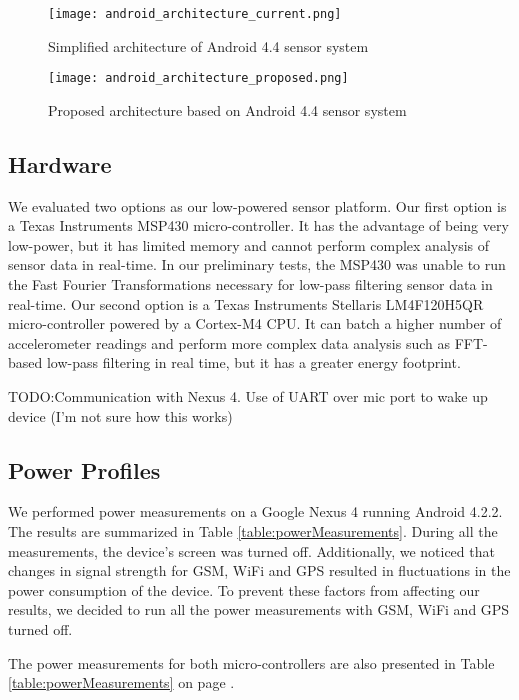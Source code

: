 \begin{figure}[h]
	\texttt{[image: android\_architecture\_current.png]}
	\caption{Simplified architecture of Android 4.4 sensor system}
    \label{fig:androidArchCurrent}
\end{figure}

\begin{figure}[h]
	\texttt{[image: android\_architecture\_proposed.png]}
	\caption{Proposed architecture based on Android 4.4 sensor system}
    \label{fig:androidArchProposed}
\end{figure}
 
\subsection{Hardware}

We evaluated two options as our low-powered sensor platform. Our first option is a Texas Instruments MSP430 micro-controller. It has the advantage of being very low-power, but it has limited memory and cannot perform complex analysis of sensor data in real-time. In our preliminary tests, the MSP430 was unable to run the Fast Fourier Transformations necessary for low-pass filtering sensor data in real-time. Our second option is a Texas Instruments Stellaris LM4F120H5QR micro-controller powered by a Cortex-M4 CPU. It can batch a higher number of accelerometer readings and perform more complex data analysis such as FFT-based low-pass filtering in real time, but it has a greater energy footprint.

TODO:Communication with Nexus 4.  Use of UART over mic port to wake up device (I'm not sure how this works)

\subsection{Power Profiles} \label{subsec:powerProfiles}

We performed power measurements on a Google Nexus 4 running Android 4.2.2. The results are summarized in Table \ref{table:powerMeasurements}. During all the measurements, the device's screen was turned off. Additionally, we noticed that changes in signal strength for GSM, WiFi and GPS resulted in fluctuations in the power consumption of the device. To prevent these factors from affecting our results, we decided to run all the power measurements with GSM, WiFi and GPS turned off.

The power measurements for both micro-controllers are also presented in Table \ref{table:powerMeasurements} on page \pageref{table:powerMeasurements}.

